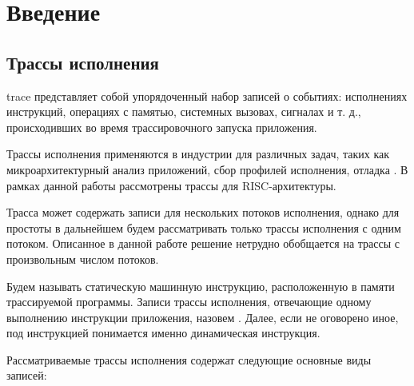 \section{Введение}

\subsection{Трассы исполнения} \label{sec:execution_traces}

\gls{trace} представляет собой упорядоченный набор записей о событиях: исполнениях инструкций, операциях с памятью, системных вызовах, сигналах и т. д., происходивших во время трассировочного запуска приложения.

Трассы исполнения применяются в индустрии для различных задач, таких как микроархитектурный анализ приложений, сбор профилей исполнения, отладка \cite{trace_checkpoint_for_dvfs,plc_behav_model_from_traces,atlantis_paper,pinplay,lisitsyn_disser}. В рамках данной работы рассмотрены трассы для RISC-архитектуры.

Трасса может содержать записи для нескольких потоков исполнения, однако для простоты в дальнейшем будем рассматривать только трассы исполнения с одним потоком. Описанное в данной работе решение нетрудно обобщается на трассы с произвольным числом потоков.

Будем называть  статическую машинную инструкцию, расположенную в памяти трассируемой программы. Записи трассы исполнения, отвечающие одному выполнению инструкции приложения, назовем . Далее, если не оговорено иное, под инструкцией понимается именно динамическая инструкция.

Рассматриваемые трассы исполнения содержат следующие основные виды записей:

